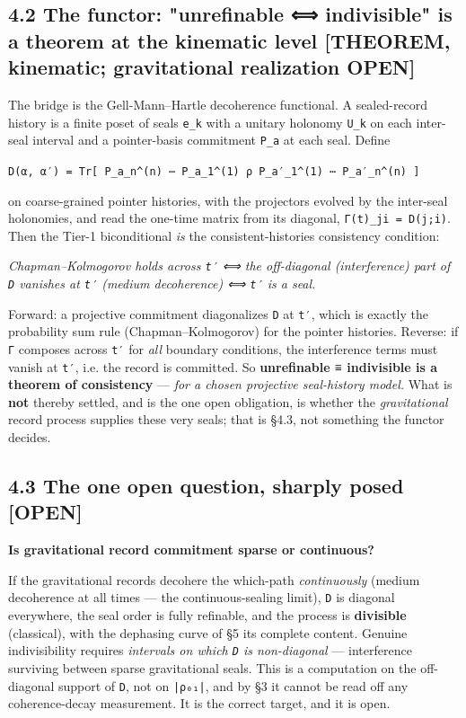 \documentclass[11pt]{article}
\begin{document}
\subsection*{4.2 The functor: "unrefinable ⟺ indivisible" is a theorem at the kinematic level [THEOREM, kinematic; gravitational realization OPEN]}
The bridge is the Gell-Mann–Hartle decoherence functional. A sealed-record history is a finite poset of seals \texttt{{e\_k}} with a unitary holonomy \texttt{U\_k} on each inter-seal interval and a pointer-basis commitment \texttt{{P\_a}} at each seal. Define

\texttt{D(α, α′) = Tr[ P\_{a\_n}\textasciicircum{}{(n)} ⋯ P\_{a\_1}\textasciicircum{}{(1)} ρ P\_{a′\_1}\textasciicircum{}{(1)} ⋯ P\_{a′\_n}\textasciicircum{}{(n)} ]}

on coarse-grained pointer histories, with the projectors evolved by the inter-seal holonomies, and read the one-time matrix from its diagonal, \texttt{Γ(t)\_{ji} = D(j;i)}. Then the Tier-1 biconditional \emph{is} the consistent-histories consistency condition:

\emph{Chapman–Kolmogorov holds across \texttt{t′} ⟺ the off-diagonal (interference) part of \texttt{D} vanishes at \texttt{t′} (medium decoherence) ⟺ \texttt{t′} is a seal.}

Forward: a projective commitment diagonalizes \texttt{D} at \texttt{t′}, which is exactly the probability sum rule (Chapman–Kolmogorov) for the pointer histories. Reverse: if \texttt{Γ} composes across \texttt{t′} for \emph{all} boundary conditions, the interference terms must vanish at \texttt{t′}, i.e. the record is committed. So \textbf{unrefinable ≡ indivisible is a theorem of consistency} — \emph{for a chosen projective seal-history model.} What is \textbf{not} thereby settled, and is the one open obligation, is whether the \emph{gravitational} record process supplies these very seals; that is §4.3, not something the functor decides.

\subsection*{4.3 The one open question, sharply posed [OPEN]}
\textbf{Is gravitational record commitment sparse or continuous?}

If the gravitational records decohere the which-path \emph{continuously} (medium decoherence at all times — the continuous-sealing limit), \texttt{D} is diagonal everywhere, the seal order is fully refinable, and the process is \textbf{divisible} (classical), with the dephasing curve of §5 its complete content. Genuine indivisibility requires \emph{intervals on which \texttt{D} is non-diagonal} — interference surviving between sparse gravitational seals. This is a computation on the off-diagonal support of \texttt{D}, not on \texttt{|ρ₀₁|}, and by §3 it cannot be read off any coherence-decay measurement. It is the correct target, and it is open.
\end{document}
